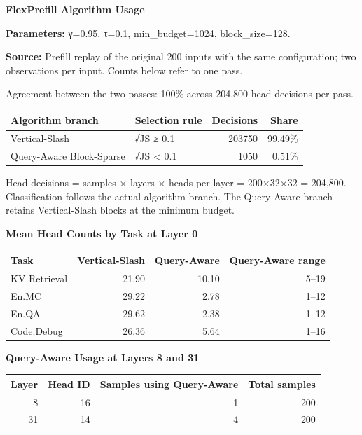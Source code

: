 \documentclass[11pt,a4paper]{article}
\begin{document}
\newpage
\begin{center}
{\Large\bfseries FlexPrefill Algorithm Usage}
\end{center}

\textbf{Parameters:} γ=0.95, τ=0.1, min\_budget=1024, block\_size=128.

\textbf{Source:} Prefill replay of the original 200 inputs with the same configuration;
two observations per input. Counts below refer to one pass.
\par Agreement between the two passes: 100\% across 204,800 head decisions per pass.

\begin{tabularx}{\textwidth}{@{}lXrr@{}}
\toprule
\textbf{Algorithm branch} & \textbf{Selection rule} & \textbf{Decisions} & \textbf{Share} \\
\midrule
Vertical-Slash & √JS ≥ 0.1 & 203750 & 99.49\% \\
Query-Aware Block-Sparse & √JS < 0.1 & 1050 & 0.51\% \\
\bottomrule
\end{tabularx}

Head decisions = samples × layers × heads per layer = 200×32×32 = 204,800.
Classification follows the actual algorithm branch. The Query-Aware branch retains
Vertical-Slash blocks at the minimum budget.

\vspace{4pt}
\textbf{Mean Head Counts by Task at Layer 0}

\begin{center}
\begin{tabular}{@{}lrr@{\hspace{30pt}}r@{}}
\toprule
\textbf{Task} & \textbf{Vertical-Slash} & \textbf{Query-Aware} & \textbf{Query-Aware range} \\
\midrule
KV Retrieval & 21.90 & 10.10 & 5--19 \\
En.MC & 29.22 & 2.78 & 1--12 \\
En.QA & 29.62 & 2.38 & 1--12 \\
Code.Debug & 26.36 & 5.64 & 1--16 \\
\bottomrule
\end{tabular}
\end{center}

\textbf{Query-Aware Usage at Layers 8 and 31}

\begin{center}
\begin{tabular}{@{}rrrr@{}}
\toprule
\textbf{Layer} & \textbf{Head ID} & \textbf{Samples using Query-Aware} & \textbf{Total samples} \\
\midrule
8 & 16 & 1 & 200 \\
31 & 14 & 4 & 200 \\
\bottomrule
\end{tabular}
\end{center}
\end{document}
